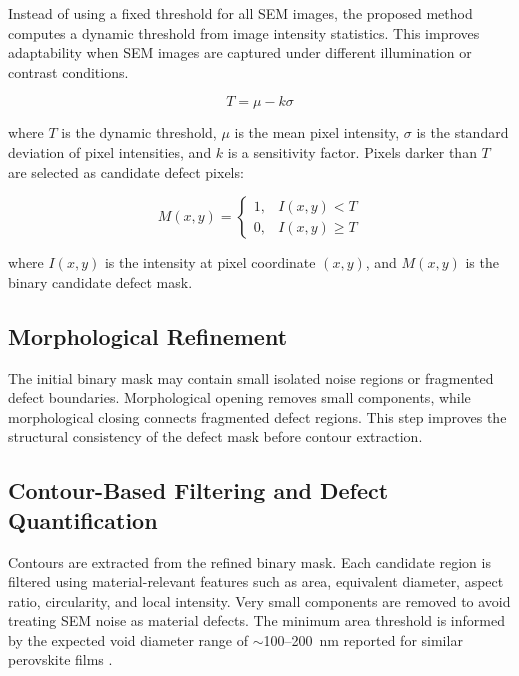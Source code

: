 \documentclass[pdflatex,sn-mathphys-num,iicol]{sn-jnl}
\theoremstyle{thmstyleone}
\theoremstyle{thmstyletwo}
\theoremstyle{thmstylethree}
\begin{document}
Instead of using a fixed threshold for all SEM images, the proposed
method computes a dynamic threshold from image intensity statistics.
This improves adaptability when SEM images are captured under
different illumination or contrast conditions.

\begin{equation}
T = \mu - k\sigma
\label{eq:threshold}
\end{equation}

where $T$ is the dynamic threshold, $\mu$ is the mean pixel
intensity, $\sigma$ is the standard deviation of pixel intensities,
and $k$ is a sensitivity factor. Pixels darker than $T$ are selected
as candidate defect pixels:

\begin{equation}
M(x,y)=
\begin{cases}
1, & I(x,y)<T \\
0, & I(x,y)\geq T
\end{cases}
\label{eq:mask}
\end{equation}

where $I(x,y)$ is the intensity at pixel coordinate $(x,y)$, and
$M(x,y)$ is the binary candidate defect mask.

\subsection{Morphological Refinement}
\label{subsec:morphological_refinement}

The initial binary mask may contain small isolated noise regions or
fragmented defect boundaries. Morphological opening removes small
components, while morphological closing connects fragmented defect
regions. This step improves the structural consistency of the defect
mask before contour extraction.

\subsection{Contour-Based Filtering and Defect Quantification}
\label{subsec:contour_filtering}

Contours are extracted from the refined binary mask. Each candidate
region is filtered using material-relevant features such as area,
equivalent diameter, aspect ratio, circularity, and local intensity.
Very small components are removed to avoid treating SEM noise as
material defects. The minimum area threshold is informed by the
expected void diameter range of $\sim$100--200~nm reported for
similar perovskite films \cite{chang2026}.
\end{document}
